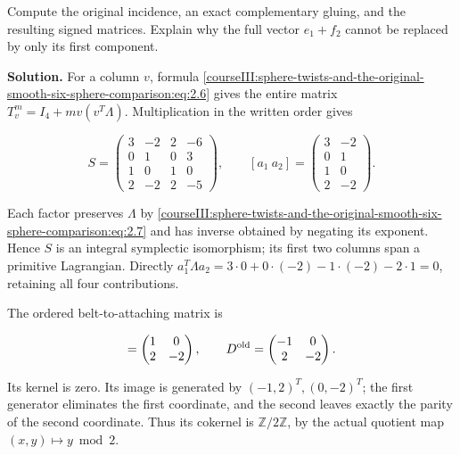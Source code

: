 Compute the original incidence, an exact complementary gluing, and the resulting signed matrices. Explain why the full vector \(e_1+f_2\) cannot be replaced by only its first component.

\textbf{Solution.} For a column \(v\), formula \eqref{courseIII:sphere-twists-and-the-original-smooth-six-sphere-comparison:eq:2.6} gives the entire matrix \(T_v^m=I_4+mv(v^T\Lambda)\). Multiplication in the written order gives

\begin{equation}
S=\begin{pmatrix}
 3&-2&2&-6\\
 0&1&0&3\\
 1&0&1&0\\
 2&-2&2&-5
 \end{pmatrix},\qquad
 [a_1\ a_2]=
 \begin{pmatrix}3&-2\\0&1\\1&0\\2&-2\end{pmatrix}.
 \label{courseIII:sphere-twists-and-the-original-smooth-six-sphere-comparison:eq:8.6}
\end{equation}

Each factor preserves \(\Lambda\) by \eqref{courseIII:sphere-twists-and-the-original-smooth-six-sphere-comparison:eq:2.7} and has inverse obtained by negating its exponent. Hence \(S\) is an integral symplectic isomorphism; its first two columns span a primitive Lagrangian. Directly \(a_1^T\Lambda a_2=3\cdot0+0\cdot(-2)-1\cdot(-2)-2\cdot1=0\), retaining all four contributions.

The ordered belt-to-attaching matrix is

\begin{equation}
[\,\lambda(e_i,a_j)\,]=
        \begin{pmatrix}1&0\\2&-2\end{pmatrix},
 \qquad
 D^{\rm old}=
        \begin{pmatrix}-1&0\\2&-2\end{pmatrix}.
 \label{courseIII:sphere-twists-and-the-original-smooth-six-sphere-comparison:eq:8.7}
\end{equation}

Its kernel is zero. Its image is generated by \((-1,2)^T,(0,-2)^T\); the first generator eliminates the first coordinate, and the second leaves exactly the parity of the second coordinate. Thus its cokernel is \(\mathbb Z/2\mathbb Z\), by the actual quotient map \((x,y)\mapsto y\bmod2\).

